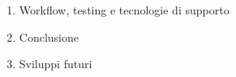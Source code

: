\documentclass[a4paper, 11pt]{report}
\begin{document}
\begin{enumerate}[label*=\arabic*.]

\item Workflow, testing e tecnologie di supporto
\item Conclusione
\item Sviluppi futuri
\end{enumerate}





%



\end{document}
